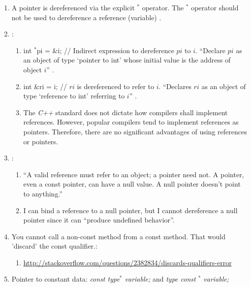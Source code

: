 \begin{enumerate}
\begin{enumerate}
\begin{enumerate}
\begin{enumerate}
			\end{enumerate}
		\item A pointer is dereferenced via the explicit $^{\ast}$ operator. The $^{\ast}$ operator should not be used to dereference a reference (variable) \cite{Saks2001}.
		\item \cite{Saks2001}: \vspace{-0.1cm}
			\begin{enumerate} \itemsep -1pt
			\item int $^{\ast}$pi = {\&}i; // Indirect expression to dereference $pi$ to $i$. ``Declare $pi$ as an object of type `pointer to int' whose initial value is the address of object $i$'' \cite{Saks2001a}.
			\item int {\&}ri = i; // $ri$ is dereferenced to refer to $i$. ``Declares $ri$ as an object of type `reference to int' referring to $i$'' \cite{Saks2001a}.
			\item The {\it C++} standard does not dictate how compilers shall implement references. However, popular compilers tend to implement references as pointers. Therefore, there are no significant advantages of using references or pointers.
			\end{enumerate}
		\item \cite{Saks2001a}: \vspace{-0.1cm}
			\begin{enumerate} \itemsep -1pt
			\item ``A valid reference must refer to an object; a pointer need not. A pointer, even a const pointer, can have a null value. A null pointer doesn't point to anything.''
			\item I can bind a reference to a null pointer, but I cannot dereference a null pointer since it can ``produce undefined behavior''.
			\end{enumerate}
		\item You cannot call a non-const method from a const method. That would 'discard' the const qualifier.: \vspace{-0.1cm}
			\begin{enumerate} \itemsep -1pt
			\item \url{http://stackoverflow.com/questions/2382834/discards-qualifiers-error}
			\end{enumerate}
		\item Pointer to constant data: {\it const type$^{\ast}$ variable;} and {\it type const $^{\ast}$ variable;} \vspace{-0.1cm}
			\begin{enumerate} \itemsep -1pt

\end{enumerate}
\end{enumerate}
\end{enumerate}
\end{enumerate}
